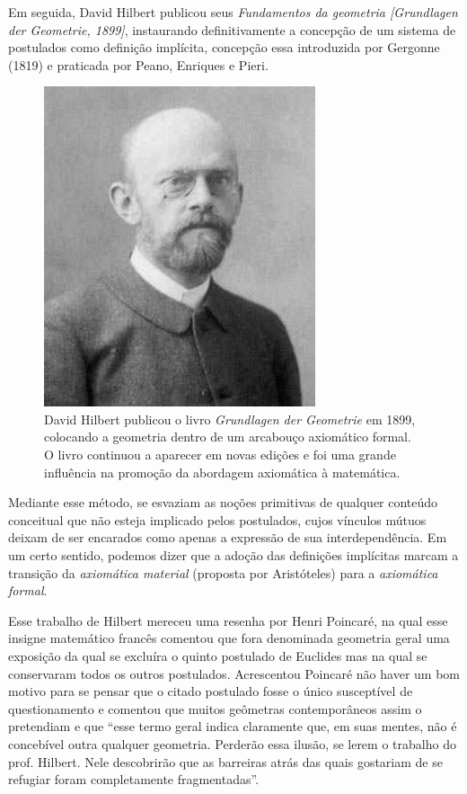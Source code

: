 \documentclass{hipatia}
\begin{document}
Em seguida, David Hilbert publicou seus \emph{Fundamentos da geometria [Grundlagen der Geometrie, 1899]}, instaurando definitivamente a concepção de um sistema de postulados como definição implícita, concepção essa introduzida por Gergonne (1819) e praticada por Peano, Enriques e Pieri. 

\begin{figure}[htb!]
    \includegraphics[width=8cm]{Hilbert.jpeg}
 \caption*{David Hilbert publicou o livro \emph{Grundlagen der Geometrie} em 1899, colocando a geometria dentro de um arcabouço axiomático formal. O livro continuou a aparecer em novas edições e foi uma grande influência na promoção da abordagem axiomática à matemática.}   
\end{figure}


Mediante esse método, se esvaziam as noções primitivas de qualquer conteúdo conceitual que não esteja implicado pelos postulados, cujos vínculos mútuos deixam de ser encarados como apenas a expressão de sua interdependência. Em um certo sentido, podemos dizer que a adoção das definições implícitas marcam a transição da \emph{axiomática material}  (proposta por Aristóteles)  para a \emph{axiomática formal}. \cite[p. 115]{beth1955}\cite[p. 691]{kneale}\cite[p. 201]{kneebone1963}

Esse trabalho de Hilbert mereceu uma resenha por Henri Poincaré, na qual esse insigne matemático francês comentou que fora denominada geometria geral uma exposição da qual se excluíra o quinto postulado de Euclides mas na qual se conservaram todos os outros postulados. Acrescentou Poincaré não haver um bom motivo para se pensar que o citado postulado fosse o único susceptível de questionamento e comentou que muitos geômetras contemporâneos assim o pretendiam e que ``esse termo geral indica claramente que, em suas mentes, não é concebível outra qualquer geometria. Perderão essa ilusão, se lerem o trabalho do prof. Hilbert. Nele descobrirão que as barreiras atrás das quais gostariam de se refugiar foram completamente fragmentadas''. \cite[p. 77-78]{poincare1999}
\end{document}
